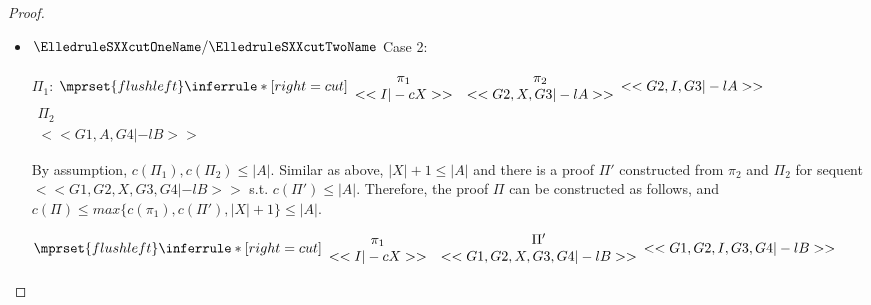\begin{proof}
\begin{enumerate}
\begin{itemize}
    \item $\ElledruleSXXcutOneName/\ElledruleSXXcutTwoName$ Case 2:
      \begin{center}
        \scriptsize
        $\Pi_1$:
        \begin{math}
          $$\mprset{flushleft}
          \inferrule* [right={\tiny cut}] {
            {
              \begin{array}{cc}
                \pi_1 & \pi_2 \\
                {<<I |-c X>>} & {<<G2, X, G3 |-l A>>}
              \end{array}
            }
          }{<<G2, I, G3 |-l A>>}
        \end{math}
        \qquad\qquad
        \begin{math}
          \begin{array}{c}
            \Pi_2 \\
            {<<G1, A, G4 |-l B>>}
          \end{array}
        \end{math}
      \end{center}
      By assumption, $c(\Pi_1),c(\Pi_2)\leq |A|$. Similar as above, $|X|+1\leq |A|$ and there
      is a proof $\Pi'$ constructed from $\pi_2$ and $\Pi_2$ for sequent
      $<<G1, G2, X, G3, G4 |-l B>>$ s.t. $c(\Pi')\leq|A|$. Therefore, the proof $\Pi$ can be
      constructed as follows, and $c(\Pi)\leq max\{c(\pi_1),c(\Pi'),|X|+1\}\leq |A|$.
      \begin{center}
        \scriptsize
        \begin{math}
          $$\mprset{flushleft}
          \inferrule* [right={\tiny cut}] {
            {
              \begin{array}{cc}
                \pi_1  & \Pi' \\
                {<<I |-c X>>} & {<<G1, G2, X, G3, G4 |-l B>>}
              \end{array}
            }
          }{<<G1, G2, I, G3, G4 |-l B>>}
        \end{math}
      \end{center}


\end{itemize}
\end{enumerate}
\end{proof}
